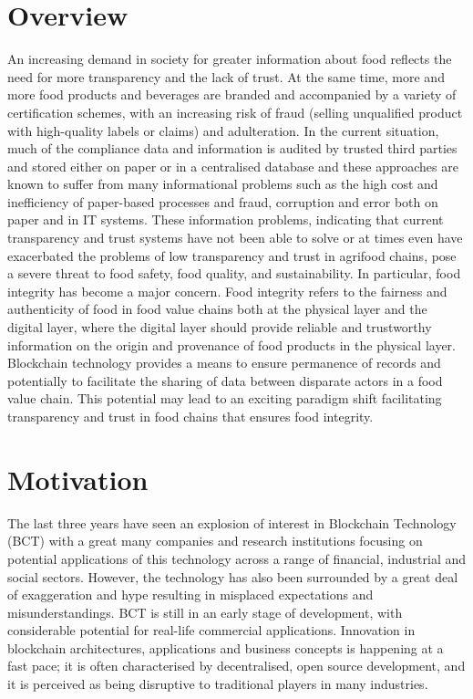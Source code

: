 \documentclass[oneside,a4paper,12pt]{report}
\begin{document}
\section{Overview}
An increasing demand in society for greater information about food reflects the need for more transparency and the lack of trust. At the same time, more and more food products and beverages are branded and accompanied by a variety of certification schemes, with an increasing risk of fraud (selling unqualified product with high-quality labels or claims) and adulteration. In the current situation, much of the compliance data and information is audited by trusted third parties and stored either on paper or in a centralised database and these approaches are known to suffer from many informational problems such as the high cost and inefficiency of paper-based processes and fraud, corruption and error both on paper and in IT systems. These information problems, indicating that current transparency and trust systems have not been able to solve or at times even have exacerbated the problems of low transparency and trust in agrifood chains, pose a severe threat to food safety, food quality, and sustainability. In particular, food integrity has become a major concern. Food integrity refers to the fairness and authenticity of food in food value chains both at the physical layer and the digital layer, where the digital layer should provide reliable and trustworthy information on the origin and provenance of food products in the physical layer. Blockchain technology provides a means to ensure permanence of records and potentially to facilitate the sharing of data between disparate actors in a food value chain. This potential may lead to an exciting paradigm shift facilitating transparency and trust in food chains that ensures food integrity.
\section{Motivation}
The last three years have seen an explosion of interest in Blockchain Technology (BCT) with a great many companies and research institutions focusing on potential applications of this technology across a range of financial, industrial and social sectors. However, the technology has also been surrounded by a great deal of exaggeration and hype resulting in misplaced expectations and misunderstandings. BCT is still in an early stage of development, with considerable potential for real-life commercial applications. Innovation in blockchain architectures, applications and business concepts is happening at a fast pace; it is often characterised by decentralised, open source development, and it is perceived as being disruptive to traditional players in many industries.
\end{document}
